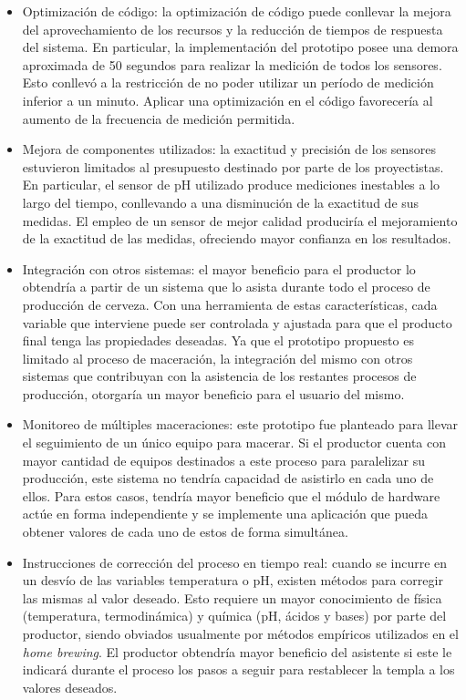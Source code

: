 \begin{itemize}
    \item Optimización de código: la optimización de código puede conllevar la mejora del aprovechamiento de los recursos y la reducción de tiempos de respuesta del sistema. En particular, la implementación del prototipo posee una demora aproximada de 50 segundos para realizar la medición de todos los sensores. Esto conllevó a la restricción de no poder utilizar un período de medición inferior a un minuto. Aplicar una optimización en el código favorecería al aumento de la frecuencia de medición permitida.
    
    \item Mejora de componentes utilizados: la exactitud y precisión de los sensores estuvieron limitados al presupuesto destinado por parte de los proyectistas. En particular, el sensor de pH utilizado produce mediciones inestables a lo largo del tiempo, conllevando a una disminución de la exactitud de sus medidas. El empleo de un sensor de mejor calidad produciría el mejoramiento de la exactitud de las medidas, ofreciendo mayor confianza en los resultados.
    
    \item Integración con otros sistemas: el mayor beneficio para el productor lo obtendría a partir de un sistema que lo asista durante todo el proceso de producción de cerveza. Con una herramienta de estas características, cada variable que interviene puede ser controlada y ajustada para que el producto final tenga las propiedades deseadas. Ya que el prototipo propuesto es limitado al proceso de maceración, la integración del mismo con otros sistemas que contribuyan con la asistencia de los restantes procesos de producción, otorgaría un mayor beneficio para el usuario del mismo.
    
    \item Monitoreo de múltiples maceraciones: este prototipo fue planteado para llevar el seguimiento de un único equipo para macerar. Si el productor cuenta con mayor cantidad de equipos destinados a este proceso para paralelizar su producción, este sistema no tendría capacidad de asistirlo en cada uno de ellos. Para estos casos, tendría mayor beneficio que el módulo de hardware actúe en forma independiente y se implemente una aplicación que pueda obtener valores de cada uno de estos de forma simultánea.
    
    \item Instrucciones de corrección del proceso en tiempo real: cuando se incurre en un desvío de las variables temperatura o pH, existen métodos para corregir las mismas al valor deseado. Esto requiere un mayor conocimiento de física (temperatura, termodinámica) y química (pH, ácidos y bases) por parte del productor, siendo obviados usualmente por métodos empíricos utilizados en el \textit{home brewing}. El productor obtendría mayor beneficio del asistente si este le indicará durante el proceso los pasos a seguir para restablecer la templa a los valores deseados.
    

\end{itemize}
